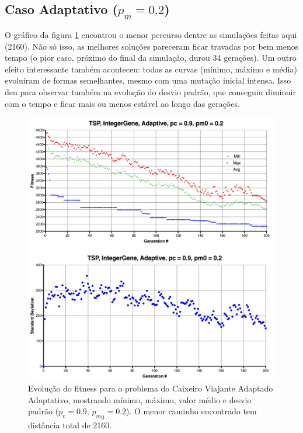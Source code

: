 \subsection{Caso Adaptativo ($p_m = 0.2$)}

O gráfico da figura \ref{fig:tsp_02_adaptative} encontrou o menor percurso dentre as simulações feitas aqui (2160). Não só isso, as melhores soluções pareceram ficar travadas por bem menos tempo (o pior caso, próximo do final da simulação, durou 34 gerações). Um outro efeito interessante também aconteceu: todas as curvas (mínimo, máximo e média) evoluíram de formas semelhantes, mesmo com uma mutação inicial intensa. Isso deu para observar também na evolução do desvio padrão, que conseguiu diminuir com o tempo e ficar mais ou menos estável ao longo das gerações.

\begin{figure}[ht!]
    \centering \includegraphics[width=1.0\textwidth]{tsp_02_adaptive.jpg}
    \caption{Evolução do fitness para o problema do Caixeiro Viajante Adaptado Adaptativo, mostrando mínimo, máximo, valor médio e desvio padrão ($p_c=0.9$, ${p_m}_0=0.2$). O menor caminho encontrado tem distância total de 2160.}
    \label{fig:tsp_02_adaptative}
\end{figure}


